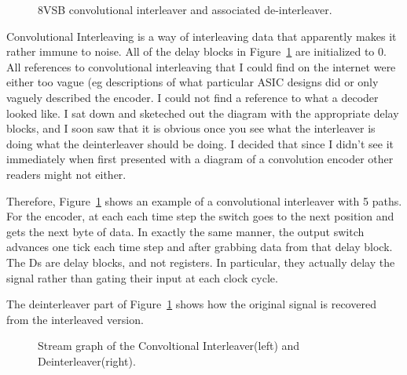 \begin{figure}
\center
\epsfxsize=5.5in
\caption{8VSB convolutional interleaver and associated de-interleaver.}
\label{fig:convolution-interleaver}
\end{figure}

Convolutional Interleaving is a way of interleaving data that apparently makes
it rather immune to noise. All of the delay blocks in Figure~\ref{fig:convolution-interleaver}
are initialized to 0. All references to convolutional interleaving that I could find
on the internet were either too vague (eg descriptions of what particular ASIC designs did
or only vaguely described the encoder. I could not find a reference to what a decoder looked 
like. I sat down and sketeched out the diagram with the appropriate delay blocks, and I soon 
saw that it is obvious once you see what the interleaver is doing what the deinterleaver should
be doing. I decided that since I didn't see it immediately when first presented with a
diagram of a convolution encoder other readers might not either.

Therefore, Figure~\ref{fig:convolution-interleaver} shows an example of a convolutional
interleaver with 5 paths. For the encoder, at each each time step the switch goes to the
next position and gets the next byte of data. In exactly the same manner, the output
switch advances one tick each time step and after grabbing data from that delay block.
The Ds are delay blocks, and not registers. In particular, they actually delay the signal
rather than gating their input at each clock cycle.

The deinterleaver part of Figure~\ref{fig:convolution-interleaver} shows how the 
original signal is recovered from the interleaved version. 

\begin{figure}
\center
\epsfxsize=3.0in
\epsfxsize=3.0in
\caption{Stream graph of the Convoltional Interleaver(left) and Deinterleaver(right).}
\label{fig:sg-convolution-interleave}
\end{figure}


